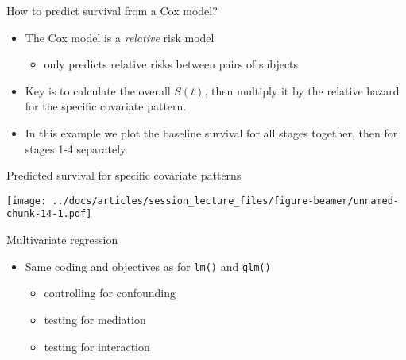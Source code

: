 \documentclass[
  ignorenonframetext,
]{beamer}
\providecommand{\tightlist}{%
  \setlength{\itemsep}{0pt}\setlength{\parskip}{0pt}}
\begin{document}
\begin{frame}{How to predict survival from a Cox model?}
\protect\hypertarget{how-to-predict-survival-from-a-cox-model}{}

\begin{itemize}
\tightlist
\item
  The Cox model is a \emph{relative} risk model

  \begin{itemize}
  \tightlist
  \item
    only predicts relative risks between pairs of subjects
  \end{itemize}
\item
  Key is to calculate the overall \(S(t)\), then multiply it by the
  relative hazard for the specific covariate pattern.
\item
  In this example we plot the baseline survival for all stages together,
  then for stages 1-4 separately.
\end{itemize}

\end{frame}

\begin{frame}{Predicted survival for specific covariate patterns}
\protect\hypertarget{predicted-survival-for-specific-covariate-patterns}{}

\texttt{[image: ../docs/articles/session\_lecture\_files/figure-beamer/unnamed-chunk-14-1.pdf]}

\end{frame}

\begin{frame}[fragile]{Multivariate regression}
\protect\hypertarget{multivariate-regression}{}

\begin{itemize}
\tightlist
\item
  Same coding and objectives as for \texttt{lm()} and \texttt{glm()}

  \begin{itemize}
  \tightlist
  \item
    controlling for confounding
  \item
    testing for mediation
  \item
    testing for interaction
  \end{itemize}
\end{itemize}

\end{frame}
\end{document}
